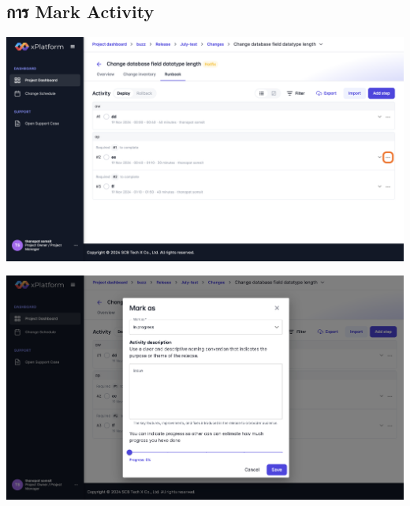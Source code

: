 \subsection{การ Mark Activity}
\begin{center}
    \includegraphics[width=\linewidth]{resources/pages/change-runbook/mark-activity/13.png}
    
    \vspace{1in}
    
    \includegraphics[width=\linewidth]{resources/pages/change-runbook/mark-activity/14.png}
\end{center}
    
